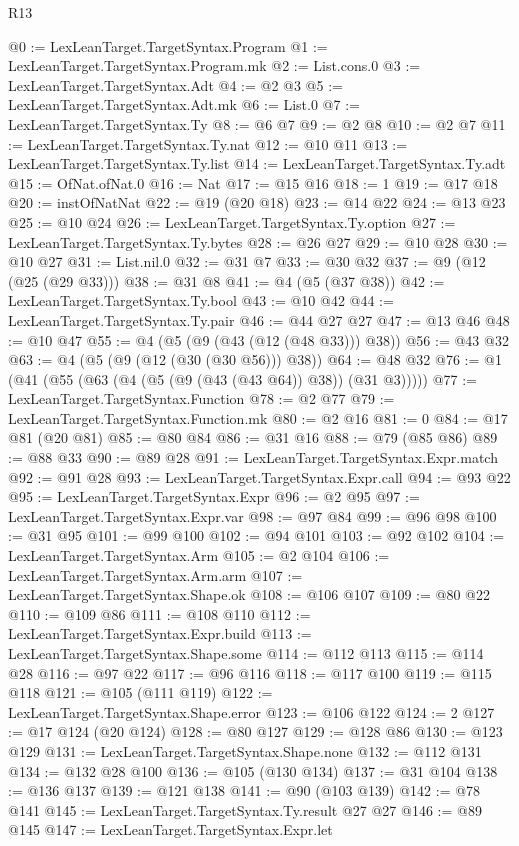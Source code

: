 \begin{lexlean}{R13}
\begin{coremodule}
@0 := LexLeanTarget.TargetSyntax.Program
@1 := LexLeanTarget.TargetSyntax.Program.mk
@2 := List.cons.{0}
@3 := LexLeanTarget.TargetSyntax.Adt
@4 := @2 @3
@5 := LexLeanTarget.TargetSyntax.Adt.mk
@6 := List.{0}
@7 := LexLeanTarget.TargetSyntax.Ty
@8 := @6 @7
@9 := @2 @8
@10 := @2 @7
@11 := LexLeanTarget.TargetSyntax.Ty.nat
@12 := @10 @11
@13 := LexLeanTarget.TargetSyntax.Ty.list
@14 := LexLeanTarget.TargetSyntax.Ty.adt
@15 := OfNat.ofNat.{0}
@16 := Nat
@17 := @15 @16
@18 := 1
@19 := @17 @18
@20 := instOfNatNat
@22 := @19 (@20 @18)
@23 := @14 @22
@24 := @13 @23
@25 := @10 @24
@26 := LexLeanTarget.TargetSyntax.Ty.option
@27 := LexLeanTarget.TargetSyntax.Ty.bytes
@28 := @26 @27
@29 := @10 @28
@30 := @10 @27
@31 := List.nil.{0}
@32 := @31 @7
@33 := @30 @32
@37 := @9 (@12 (@25 (@29 @33)))
@38 := @31 @8
@41 := @4 (@5 (@37 @38))
@42 := LexLeanTarget.TargetSyntax.Ty.bool
@43 := @10 @42
@44 := LexLeanTarget.TargetSyntax.Ty.pair
@46 := @44 @27 @27
@47 := @13 @46
@48 := @10 @47
@55 := @4 (@5 (@9 (@43 (@12 (@48 @33))) @38))
@56 := @43 @32
@63 := @4 (@5 (@9 (@12 (@30 (@30 @56))) @38))
@64 := @48 @32
@76 := @1 (@41 (@55 (@63 (@4 (@5 (@9 (@43 (@43 @64)) @38)) (@31 @3)))))
@77 := LexLeanTarget.TargetSyntax.Function
@78 := @2 @77
@79 := LexLeanTarget.TargetSyntax.Function.mk
@80 := @2 @16
@81 := 0
@84 := @17 @81 (@20 @81)
@85 := @80 @84
@86 := @31 @16
@88 := @79 (@85 @86)
@89 := @88 @33
@90 := @89 @28
@91 := LexLeanTarget.TargetSyntax.Expr.match
@92 := @91 @28
@93 := LexLeanTarget.TargetSyntax.Expr.call
@94 := @93 @22
@95 := LexLeanTarget.TargetSyntax.Expr
@96 := @2 @95
@97 := LexLeanTarget.TargetSyntax.Expr.var
@98 := @97 @84
@99 := @96 @98
@100 := @31 @95
@101 := @99 @100
@102 := @94 @101
@103 := @92 @102
@104 := LexLeanTarget.TargetSyntax.Arm
@105 := @2 @104
@106 := LexLeanTarget.TargetSyntax.Arm.arm
@107 := LexLeanTarget.TargetSyntax.Shape.ok
@108 := @106 @107
@109 := @80 @22
@110 := @109 @86
@111 := @108 @110
@112 := LexLeanTarget.TargetSyntax.Expr.build
@113 := LexLeanTarget.TargetSyntax.Shape.some
@114 := @112 @113
@115 := @114 @28
@116 := @97 @22
@117 := @96 @116
@118 := @117 @100
@119 := @115 @118
@121 := @105 (@111 @119)
@122 := LexLeanTarget.TargetSyntax.Shape.error
@123 := @106 @122
@124 := 2
@127 := @17 @124 (@20 @124)
@128 := @80 @127
@129 := @128 @86
@130 := @123 @129
@131 := LexLeanTarget.TargetSyntax.Shape.none
@132 := @112 @131
@134 := @132 @28 @100
@136 := @105 (@130 @134)
@137 := @31 @104
@138 := @136 @137
@139 := @121 @138
@141 := @90 (@103 @139)
@142 := @78 @141
@145 := LexLeanTarget.TargetSyntax.Ty.result @27 @27
@146 := @89 @145
@147 := LexLeanTarget.TargetSyntax.Expr.let

\end{coremodule}
\end{lexlean}
